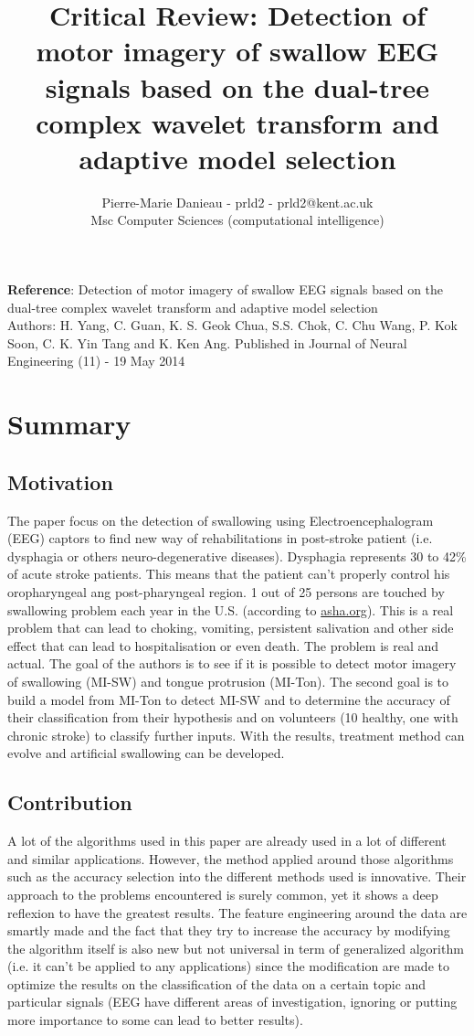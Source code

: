 \documentclass[a4paper, 12pt, english]{article}
\title{Critical Review: Detection of motor imagery of swallow EEG signals based on the dual-tree complex wavelet transform and adaptive model selection}
\author{Pierre-Marie Danieau - prld2 - prld2@kent.ac.uk\\ Msc Computer Sciences (computational intelligence)}
\begin{document}
\maketitle

\textbf{Reference}: Detection of motor imagery of swallow EEG signals based on the dual-tree complex wavelet transform and adaptive model selection\\
Authors: H. Yang, C. Guan, K. S. Geok Chua, S.S. Chok, C. Chu Wang, P. Kok Soon, C. K. Yin Tang and K. Ken Ang.
Published in Journal of Neural Engineering (11) - 19 May 2014
\clearpage

\section{Summary}
\subsection{Motivation}
The paper focus on the detection of swallowing using Electroencephalogram (EEG) captors to find new way of rehabilitations in post-stroke patient (i.e. dysphagia or others neuro-degenerative diseases). Dysphagia represents 30 to 42\% of acute stroke patients. This means that the patient can't properly control his oropharyngeal ang post-pharyngeal region. 1 out of 25 persons are touched by swallowing problem each year in the U.S. (according to \href{https://www.asha.org/PRPSpecificTopic.aspx?folderid=8589942550&section=Incidence_and_Prevalence}{asha.org}). This is a real problem that can lead to choking, vomiting, persistent salivation and other side effect that can lead to hospitalisation or even death. The problem is real and actual. The goal of the authors is to see if it is possible to detect motor imagery of swallowing (MI-SW) and tongue protrusion (MI-Ton). The second goal is to build a model from MI-Ton to detect MI-SW and to determine the accuracy of their classification from their hypothesis and on volunteers (10 healthy, one with chronic stroke) to classify further inputs. With the results, treatment method can evolve and artificial swallowing can be developed.

\subsection{Contribution}
A lot of the algorithms used in this paper are already used in a lot of different and similar applications. However, the method applied around those algorithms such as the accuracy selection into the different methods used is innovative. Their approach to the problems encountered is surely common, yet it shows a deep reflexion to have the greatest results. The feature engineering around the data are smartly made and the fact that they try to increase the accuracy by modifying the algorithm itself is also new but not universal in term of generalized algorithm (i.e. it can't be applied to any applications) since the modification are made to optimize the results on the classification of the data on a certain topic and particular signals (EEG have different areas of investigation, ignoring or putting more importance to some can lead to better results).
\end{document}
